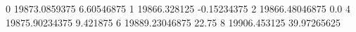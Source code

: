 0 19873.0859375 6.60546875
1 19866.328125 -0.15234375
2 19866.48046875 0.0
4 19875.90234375 9.421875
6 19889.23046875 22.75
8 19906.453125 39.97265625
